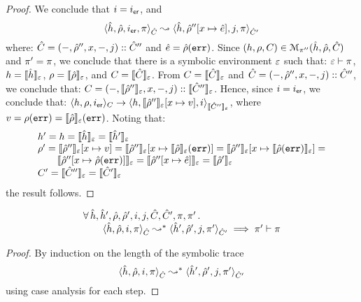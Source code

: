 \begin{proof}
\noindent{} 
We conclude that $i =  \procerrlab$, and 
$$\symbtrans{\sheap, \sstore, \procerrlab, \pc}{\sheap, \sstore''[\jvar \mapsto \sexpr], j, \pc}[\sctx][\sctx']$$
where: 
$\sctx = (-, \sstore'', \jvar, -, j) :: \sctx''$ and $\sexpr = \sstore(\procerrvar)$. 
Since $(\heap, \store, \ctx) \in \smodels{\sheap, \sstore, \sctx}{\pc''}$ and $\pc' = \pc$, we conclude that 
there is a symbolic environment $\senv$ such that: $\senv \vdash \pc$, 
$\heap = \semexpr{\sheap}{\senv}$, $\store = \semexpr{\sstore}{\senv}$, 
and $\ctx = \semexpr{\sctx}{\senv}$.
From $\ctx = \semexpr{\sctx}{\senv}$ and $\sctx = (-, \sstore'', \jvar, -, j) :: \sctx''$, we conclude 
that: $\ctx =  (-, \semexpr{\sstore''}{\senv}, \jvar, -, j) :: \semexpr{\sctx''}{\senv}$.
Hence, since $i =  \procerrlab$, 
we conclude that: $\semtrans{\heap, \store, \procerrlab}{\heap, \semexpr{\sstore''}{\senv}[\jvar \mapsto \val], i}[C][\semexpr{\sctx''}{\senv}]$, 
where $\val =  \store(\procerrvar) = \semexpr{\sstore}{\senv}(\procerrvar)$.
Noting that: 
$$ 
 \begin{array}{l}
  \heap' = \heap = \semexpr{\sheap}{\senv} = \semexpr{\sheap'}{\senv} \\ 
  \store' = \semexpr{\sstore''}{\senv}[\jvar \mapsto \val] = 
       \semexpr{\sstore''}{\senv}[\jvar \mapsto \semexpr{\sstore}{\senv}(\procerrvar)] = 
        \semexpr{\sstore''}{\senv}[\jvar \mapsto \semexpr{\sstore(\procerrvar)}{\senv}] = \\
       \qquad  \semexpr{\sstore''[\jvar \mapsto \sstore(\procerrvar)]}{\senv}  = 
       \semexpr{\sstore''[\jvar \mapsto \sexpr]}{\senv}  = 
       \semexpr{\sstore'}{\senv}  \\ 
 \ctx' = \semexpr{\sctx''}{\senv} = \semexpr{\sctx'}{\senv} 
\end{array}
$$
the result follows. 
\end{proof}

\begin{lemma}\label{lemma:pc:monotonocity}
$$
\begin{array}{l}
\forall \, \sheap, \sheap', \sstore, \sstore', i, j, \sctx, \sctx', \pc, \pc' \, . \,  \\ 
\qquad \symbtranstrans{\sheap, \sstore, i, \pc}{\sheap', \sstore', j, \pc'}[\sctx][\sctx']  
   \implies \pc' \vdash \pc
\end{array}
$$
\end{lemma}
\begin{proof}
By induction on the length of the symbolic trace $$\symbtranstrans{\sheap, \sstore, i, \pc}{\sheap', \sstore', j, \pc'}[\sctx][\sctx']$$ 
using case analysis for each step. 
\end{proof}


